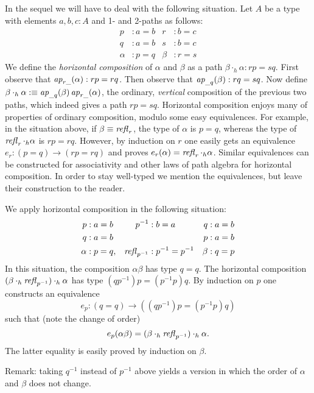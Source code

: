 \documentclass[english,a4]{article}
\begin{document}
In the sequel we will have to deal with the following situation.
Let $A$ be a type with elements $a, b, c : A$ and 1- and 2-paths as follows:
%
\begin{align*}
  p &: a = b       &       r &: b = c \\
  q &: a = b       &       s &: b = c \\
  \alpha &: p = q  &   \beta &: r = s
\end{align*}
%
We define the \emph{horizontal composition} of $\alpha$ and $\beta$ as 
a path $\beta\cdot_h\alpha: rp=sq$.
First observe that $\mathop{{\it ap}_{r\_}}(\alpha):rp=rq$.
Then observe that $\mathop{{\it ap}_{\_q}}(\beta):rq=sq$.
Now define $\beta\cdot_h\alpha \mathrel{\hbox{:}\mkern-5mu\equiv} \mathop{{\it ap}_{\_q}}(\beta)\mathop{{\it ap}_{r\_}}(\alpha)$,
the ordinary, \emph{vertical} composition of the previous two paths,
which indeed gives a path $rp=sq$. Horizontal composition enjoys many of
properties of ordinary composition, modulo some easy equivalences.
For example, in the situation above, if $\beta\equiv\mathop{{\mathit{refl}}_{r}}$,
the type of $\alpha$ is $p=q$, whereas the type of $\mathop{{\mathit{refl}}_{r}}\cdot_h\alpha$
is $rp=rq$. However, by induction on $r$ one easily gets an equivalence
$e_r : (p=q) \to (rp=rq)$ and proves $e_r(\alpha)=\mathop{{\mathit{refl}}_{r}}\cdot_h\alpha$.
Similar equivalences can be constructed for associativity and other laws
of path algebra for horizontal composition. In order to stay well-typed
we mention the equivalences, but leave their construction to the reader.

We apply horizontal composition in the following situation:
%
\begin{align*}
  p &: a = b       &   p^{-1}       &: b=a           & q     &: a = b \\
  q &: a = b       &                &                & p     &: a = b \\
  \alpha &: p = q, &   \mathop{{\mathit{refl}}_{p^{-1}}}&: p^{-1}=p^{-1} & \beta &: q = p
\end{align*}
% 
In this situation, the composition $\alpha\beta$ has type $q=q$.
The horizontal composition $(\beta\cdot_h\mathop{{\mathit{refl}}_{p^{-1}}})\cdot_h\alpha$
has type $(qp^{-1})p = (p^{-1}p)q$. By induction on $p$ one constructs
an equivalence 
\[
e_p: (q=q)\to((qp^{-1})p = (p^{-1}p)q)
\]
such that (note the change of order) 
\[
e_p(\alpha\beta)=(\beta\cdot_h\mathop{{\mathit{refl}}_{p^{-1}}})\cdot_h\alpha.
\]
The latter equality is easily proved by induction on $\beta$.

Remark: taking $q^{-1}$ instead of $p^{-1}$ above yields a version
in which the order of $\alpha$ and $\beta$ does  not change.
\end{document}
